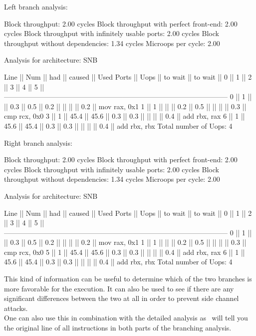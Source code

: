 \begin{example}
Left branch analysis:

Block throughput: 2.00 cycles
Block throughput with perfect front-end: 2.00 cycles
Block throughput with infinitely usable ports: 2.00 cycles
Block throughput without dependencies: 1.34 cycles
Microops per cycle: 2.00

Analysis for architecture: SNB

 Line  ||   Num   ||   had   || caused  ||            Used Ports
       ||   Uops  || to wait || to wait ||   0   ||   1   ||   2   ||   3   ||   4   ||   5   ||
 ------------------------------------------------------------------------------------------------
   0   ||    1    ||         ||   0.3   ||  0.5  ||  0.2  ||       ||       ||       ||  0.2  || mov rax, 0x1
   1   ||    1    ||         ||         ||  0.2  ||  0.5  ||       ||       ||       ||  0.3  || cmp rcx, 0x0
   3   ||    1    ||  45.4   ||  45.6   ||  0.3  ||  0.3  ||       ||       ||       ||  0.4  || add rbx, rax
   6   ||    1    ||  45.6   ||  45.4   ||  0.3  ||  0.3  ||       ||       ||       ||  0.4  || add rbx, rbx
Total number of Uops: 4


Right branch analysis:

Block throughput: 2.00 cycles
Block throughput with perfect front-end: 2.00 cycles
Block throughput with infinitely usable ports: 2.00 cycles
Block throughput without dependencies: 1.34 cycles
Microops per cycle: 2.00

Analysis for architecture: SNB

 Line  ||   Num   ||   had   || caused  ||            Used Ports
       ||   Uops  || to wait || to wait ||   0   ||   1   ||   2   ||   3   ||   4   ||   5   ||
 ------------------------------------------------------------------------------------------------
   0   ||    1    ||         ||   0.3   ||  0.5  ||  0.2  ||       ||       ||       ||  0.2  || mov rax, 0x1
   1   ||    1    ||         ||         ||  0.2  ||  0.5  ||       ||       ||       ||  0.3  || cmp rcx, 0x0
   5   ||    1    ||  45.4   ||  45.6   ||  0.3  ||  0.3  ||       ||       ||       ||  0.4  || add rbx, rax
   6   ||    1    ||  45.6   ||  45.4   ||  0.3  ||  0.3  ||       ||       ||       ||  0.4  || add rbx, rbx
Total number of Uops: 4
\end{example}

This kind of information can be useful to determine which of the two branches is more favorable for the execution. It can also be used to see if there are any significant differences between the two at all in order to prevent side channel attacks.\\
One can also use this in combination with the detailed analysis as \suaca\ will tell you the original line of all instructions in both parts of the branching analysis.


